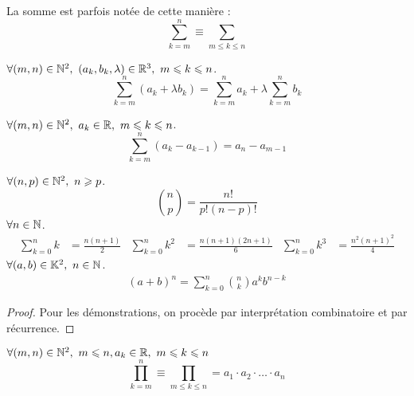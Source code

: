 \begin{notation}
    La somme est parfois notée de cette manière :
    \[ \sum_{k = m}^n \equiv \sum_{m \leq k \leq n} \]
\end{notation}

\begin{proposition}
    $\forall (m, n) \in \mathbb{N}^2,\ (a_k, b_k, \lambda) \in \mathbb{R}^3,\ m \leqslant k \leqslant n$.
    \[ \sum_{k = m}^{n} (a_k + \lambda b_k) = \sum_{k = m}^n a_k + \lambda \sum_{k = m}^n b_k \]
\end{proposition}

\begin{proposition}
    $\forall (m, n) \in \mathbb{N}^2,\ a_k \in \mathbb{R},\ m \leqslant k \leqslant n$.
    \[ \sum_{k = m}^n (a_k - a_{k - 1}) = a_n - a_{m - 1} \]
\end{proposition}

\begin{proposition}
	$\forall (n, p) \in \mathbb{N}^2,\ n \geqslant p$.
	\[ \binom{n}{p} = \frac{n!}{p!(n - p)!} \]
	$\forall n \in \mathbb{N}$.
	\begin{align*}
		\sum_{k = 0}^{n} k &= \frac{n(n+1)}{2} & 
		\sum_{k = 0}^{n} k^2 &= \frac{n(n+1)(2n+1)}{6} &
		\sum_{k = 0}^{n} k^3 &= \frac{n^2(n+1)^2}{4}
	\end{align*}
	$\forall (a, b) \in \mathbb{K}^2,\ n \in \mathbb{N}$.
	\begin{align*}
		(a + b)^n = \sum_{k = 0}^{n} \binom{n}{k} a^kb^{n-k}
	\end{align*}
\end{proposition}
\begin{proof}
    Pour les démonstrations, on procède par interprétation combinatoire et par récurrence.
\end{proof}

\begin{definition}[Produit]
    $\forall (m, n) \in \mathbb{N}^2,\ m \leqslant n, a_k \in \mathbb{R},\ m \leqslant k \leqslant n$
    \[ \prod_{k = m}^{n} \equiv \prod_{m \leq k \leq n} = a_1 \cdot a_2 \cdot \ldots \cdot a_n \]
\end{definition}